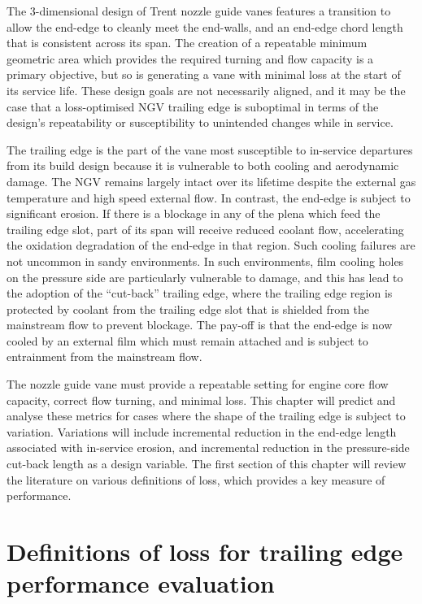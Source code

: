 \documentclass[a4paper, 11pt, oneside]{report}
\begin{document}
The 3-dimensional design of Trent nozzle guide vanes features a transition to allow the end-edge to cleanly meet the end-walls, and an end-edge chord length that is consistent across its span. The creation of a repeatable minimum geometric area which provides the required turning and flow capacity is a primary objective, but so is generating a vane with minimal loss at the start of its service life. These design goals are not necessarily aligned, and it may be the case that  a loss-optimised NGV trailing edge is suboptimal in terms of the design's repeatability or susceptibility to unintended changes while in service.

The trailing edge is the part of the vane most susceptible to in-service departures from its build design because it is vulnerable to both cooling and aerodynamic damage. The NGV remains largely intact over its lifetime despite the external gas temperature and high speed external flow. In contrast, the end-edge is subject to significant erosion. If there is a blockage in any of the plena which feed the trailing edge slot, part of its span will receive reduced coolant flow, accelerating the oxidation degradation of the end-edge in that region. Such cooling failures are not uncommon in sandy environments. In such environments, film cooling holes on the pressure side are particularly vulnerable to damage, and this has lead to the adoption of the ``cut-back'' trailing edge, where the trailing edge region is protected by coolant from the trailing edge slot that is shielded from the mainstream flow to prevent blockage. The pay-off is that the end-edge is now cooled by an external film which must remain attached and is subject to entrainment from the mainstream flow.

The nozzle guide vane must provide a repeatable setting for engine core flow capacity, correct flow turning, and minimal loss. This chapter will predict and analyse these metrics for cases where the shape of the trailing edge is subject to variation. Variations will include incremental reduction in the end-edge length associated with in-service erosion, and incremental reduction in the pressure-side cut-back length as a design variable. The first section of this chapter will review the literature on various definitions of loss, which provides a key measure of performance.


\section{Definitions of loss for trailing edge performance evaluation}
\label{definitions_of_loss}
\end{document}
